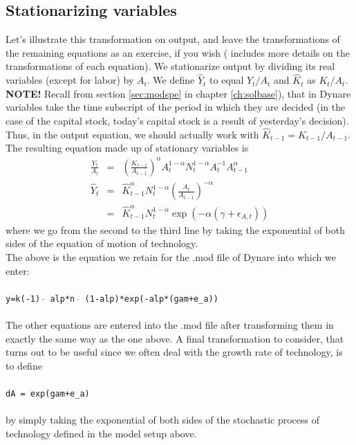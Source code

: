 \subsection{Stationarizing variables}
Let's illustrate this transformation on output, and leave the transformations of the remaining equations as an exercise, if you wish (\citet{CogleyNason1994} includes more details on the transformations of each equation). We stationarize output by dividing its real variables (except for labor) by $A_t$. We define $\widehat{Y}_t$ to equal $Y_t / A_t$ and $\widehat{K}_t$ as $K_t / A_t$. \textsf{\textbf{NOTE!}} Recall from section \ref{sec:modspe} in chapter \ref{ch:solbase}), that in Dynare variables take the time subscript of the period in which they are decided (in the case of the capital stock, today's capital stock is a result of yesterday's decision). Thus, in the output equation, we should actually work with $\widehat{K}_{t-1}=K_{t-1} / A_{t-1}$. The resulting equation made up of stationary variables is
\begin{eqnarray*}
\frac{Y_t}{A_t} & = & \left( \frac{K_{t-1}}{A_{t-1}} \right)^\alpha A_t^{1-\alpha} N_t^{1-\alpha} A_t^{-1} A_{t-1}^\alpha \\
\widehat{Y}_t & = & \widehat{K}_{t-1}^\alpha N_t^{1-\alpha} \left( \frac{A_t}{A_{t-1}} \right)^{-\alpha} \\
& = & \widehat{K}_{t-1}^\alpha N_t^{1-\alpha} \exp(-\alpha (\gamma + \epsilon_{A,t}))
\end{eqnarray*}
where we go from the second to the third line by taking the exponential of both sides of the equation of motion of technology.\\

The above is the equation we retain for the .mod file of Dynare into which we enter:\\
\\
\texttt{y=k(-1) $\widehat{}$ alp*n $\widehat{}$ (1-alp)*exp(-alp*(gam+e\_a))}\\
\\

The other equations are entered into the .mod file after transforming them in exactly the same way as the one above. A final transformation to consider, that turns out to be useful since we often deal with the growth rate of technology, is to define \\
\\
\texttt{dA = exp(gam+e\_a)}\\
\\
by simply taking the exponential of both sides of the stochastic process of technology defined in the model setup above. \\

